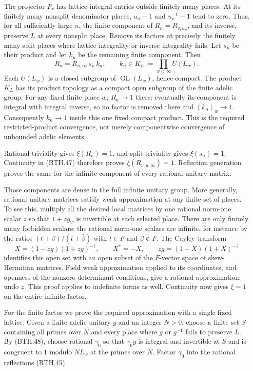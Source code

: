 The projector \(P_v\) has lattice-integral entries outside
finitely many places.  At its finitely many nonsplit
denominator places, \(u_n-1\) and \(u_n^{-1}-1\) tend to zero.
Thus, for all sufficiently large \(n\), the finite component
of \(R_n=R_{v,u_n}\), and its inverse, preserve \(L\) at
every nonsplit place.  Remove its factors at precisely the
finitely many split places where lattice integrality or
inverse integrality fails.  Let \(s_n\) be their product and
let \(k_n\) be the remaining finite component.  Then
\[
 R_n=R_{n,\infty}\,s_n\,k_n,\qquad
 k_n\in K_L:=\prod_{w<\infty}U(L_w).                         \tag{BTH.47}
\]
Each \(U(L_w)\) is a closed subgroup of
\(\operatorname{GL}(L_w)\), hence compact.  The product
\(K_L\) has its product topology as a compact open
subgroup of the finite adelic group.
For any fixed finite place \(w\), \(R_n\to1\) there;
eventually its component is integral with integral inverse,
so no factor is removed there and \((k_n)_w\to1\).
Consequently \(k_n\to1\) inside this one fixed compact
product.  This is the required restricted-product
convergence, not merely componentwise convergence of
unbounded adelic elements.

Rational triviality gives \(\xi(R_n)=1\), and split
triviality gives \(\xi(s_n)=1\).  Continuity in (BTH.47)
therefore proves
\(\xi(R_{v,u,\infty})=1\).
Reflection generation proves the same for the infinite
component of every rational unitary matrix.

Those components are dense in the full infinite unitary
group.  More generally, rational unitary matrices satisfy
weak approximation at any finite set of places.  To see
this, multiply all the desired local matrices by one
rational norm-one scalar \(z\) so that \(1+zg_w\) is
invertible at each selected place.  There are only
finitely many forbidden scalars; the rational norm-one
scalars are infinite, for instance by the ratios
\((t+\beta)/(t+\bar\beta)\) with \(t\in F\) and
\(\beta\notin F\).
The Cayley transform
\[
 X=(1-zg)(1+zg)^{-1},\qquad
 X^*=-X,\qquad zg=(1-X)(1+X)^{-1}                            \tag{BTH.48}
\]
identifies this open set with an open subset of the
\(F\)-vector space of skew-Hermitian matrices.
Field weak approximation applied to its coordinates,
and openness of the nonzero determinant conditions,
give a rational approximation; undo \(z\).
This proof applies to indefinite forms as well.
Continuity now gives \(\xi=1\) on the entire infinite
factor.

For the finite factor we prove the required approximation
with a single fixed lattice.  Given a finite adelic
unitary \(g\) and an integer \(N>0\), choose a finite set
\(S\) containing all primes over \(N\) and every place
where \(g\) or \(g^{-1}\) fails to preserve \(L\).
By (BTH.48), choose rational \(\gamma_0\) so that
\(\gamma_0g\) is integral and invertible at \(S\) and is
congruent to \(1\) modulo \(NL_w\) at the primes over \(N\).
Factor \(\gamma_0\) into the rational reflections (BTH.45).

